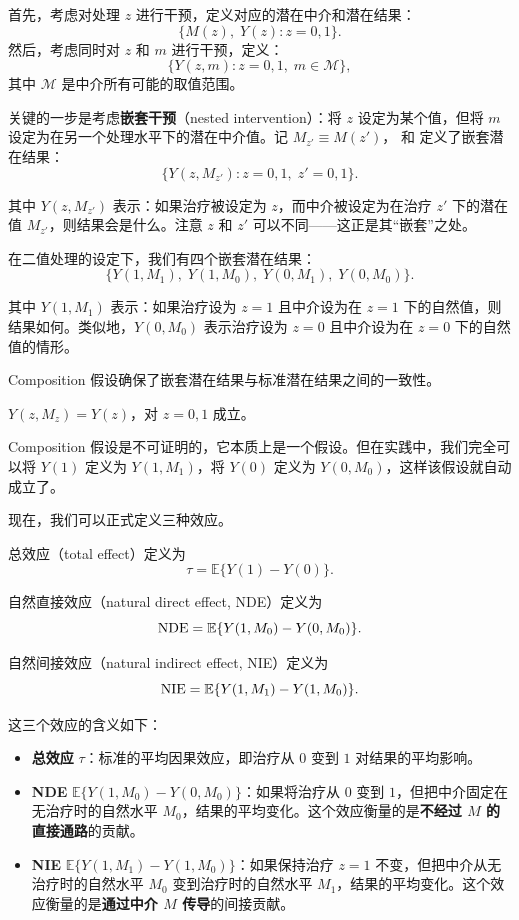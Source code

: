 首先，考虑对处理 $z$ 进行干预，定义对应的潜在中介和潜在结果：
\[
\{ M(z), \; Y(z) : z = 0, 1 \}.
\]
然后，考虑同时对 $z$ 和 $m$ 进行干预，定义：
\[
\{ Y(z, m) : z = 0, 1, \; m \in \mathcal{M} \},
\]
其中 $\mathcal{M}$ 是中介所有可能的取值范围。

关键的一步是考虑\textbf{嵌套干预}（nested intervention）：将 $z$ 设定为某个值，但将 $m$ 设定为在另一个处理水平下的潜在中介值。记 $M_{z'} \equiv M(z')$， 和  定义了嵌套潜在结果：
\[
\{ Y(z, M_{z'}) : z = 0, 1, \; z' = 0, 1 \}.
\]

其中 $Y(z, M_{z'})$ 表示：如果治疗被设定为 $z$，而中介被设定为在治疗 $z'$ 下的潜在值 $M_{z'}$，则结果会是什么。注意 $z$ 和 $z'$ 可以不同——这正是其``嵌套''之处。

在二值处理的设定下，我们有四个嵌套潜在结果：
\[
\{ Y(1, M_1), \; Y(1, M_0), \; Y(0, M_1), \; Y(0, M_0) \}.
\]

其中 $Y(1, M_1)$ 表示：如果治疗设为 $z=1$ 且中介设为在 $z=1$ 下的自然值，则结果如何。类似地，$Y(0, M_0)$ 表示治疗设为 $z=0$ 且中介设为在 $z=0$ 下的自然值的情形。

Composition 假设确保了嵌套潜在结果与标准潜在结果之间的一致性。

\begin{assumption}[Composition 假设]\label{assume:composition}
$Y(z, M_z) = Y(z)$，对 $z = 0, 1$ 成立。
\end{assumption}

Composition 假设是不可证明的，它本质上是一个假设。但在实践中，我们完全可以将 $Y(1)$ 定义为 $Y(1, M_1)$，将 $Y(0)$ 定义为 $Y(0, M_0)$，这样该假设就自动成立了。

现在，我们可以正式定义三种效应。

\begin{Definition}\label{def:mediation}
总效应（total effect）定义为
\[
\tau = \mathbb{E}\{ Y(1) - Y(0) \}.
\]

自然直接效应（natural direct effect, NDE）定义为
\[
\mathrm{NDE} = \mathbb{E}\{ Y(1, M_0) - Y(0, M_0) \}.
\]

自然间接效应（natural indirect effect, NIE）定义为
\[
\mathrm{NIE} = \mathbb{E}\{ Y(1, M_1) - Y(1, M_0) \}.
\]
\end{Definition}

这三个效应的含义如下：

\begin{itemize}
  \item \textbf{总效应} $\tau$：标准的平均因果效应，即治疗从 $0$ 变到 $1$ 对结果的平均影响。
  \item \textbf{NDE} $\mathbb{E}\{Y(1, M_0) - Y(0, M_0)\}$：如果将治疗从 $0$ 变到 $1$，但把中介固定在无治疗时的自然水平 $M_0$，结果的平均变化。这个效应衡量的是\textbf{不经过 $M$ 的直接通路}的贡献。
  \item \textbf{NIE} $\mathbb{E}\{Y(1, M_1) - Y(1, M_0)\}$：如果保持治疗 $z=1$ 不变，但把中介从无治疗时的自然水平 $M_0$ 变到治疗时的自然水平 $M_1$，结果的平均变化。这个效应衡量的是\textbf{通过中介 $M$ 传导}的间接贡献。
\end{itemize}

